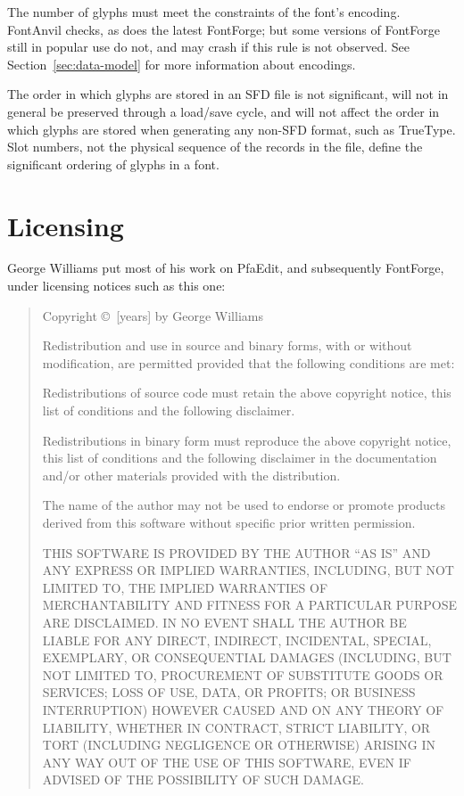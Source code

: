 \documentclass[11pt]{report}
\begin{document}
The number of glyphs must meet the constraints of the font's encoding. 
FontAnvil checks, as does the latest FontForge; but some versions of
FontForge still in popular use do not, and may crash if this rule is not
observed.  See Section~\ref{sec:data-model} for more information about
encodings.

The order in which glyphs are stored in an SFD file is not significant, will
not in general be preserved through a load/save cycle, and will not affect
the order in which glyphs are stored when generating any non-SFD format,
such as TrueType.  Slot numbers, not the physical sequence of the records in
the file, define the significant ordering of glyphs in a font.

\clearpage
\fi

\chapter{Licensing}

George Williams put most of his work on PfaEdit, and subsequently FontForge,
under licensing notices such as this one:

\begin{quotation}
Copyright \copyright\ [years] by George Williams

Redistribution and use in source and binary forms, with or without
modification, are permitted provided that the following conditions are met:

Redistributions of source code must retain the above copyright notice, this
list of conditions and the following disclaimer.

Redistributions in binary form must reproduce the above copyright notice,
this list of conditions and the following disclaimer in the documentation
and/or other materials provided with the distribution.

The name of the author may not be used to endorse or promote products
derived from this software without specific prior written permission.

THIS SOFTWARE IS PROVIDED BY THE AUTHOR ``AS IS'' AND ANY EXPRESS OR IMPLIED
WARRANTIES, INCLUDING, BUT NOT LIMITED TO, THE IMPLIED WARRANTIES OF
MERCHANTABILITY AND FITNESS FOR A PARTICULAR PURPOSE ARE DISCLAIMED.  IN NO
EVENT SHALL THE AUTHOR BE LIABLE FOR ANY DIRECT, INDIRECT, INCIDENTAL,
SPECIAL, EXEMPLARY, OR CONSEQUENTIAL DAMAGES (INCLUDING, BUT NOT LIMITED TO,
PROCUREMENT OF SUBSTITUTE GOODS OR SERVICES; LOSS OF USE, DATA, OR PROFITS;
OR BUSINESS INTERRUPTION) HOWEVER CAUSED AND ON ANY THEORY OF LIABILITY,
WHETHER IN CONTRACT, STRICT LIABILITY, OR TORT (INCLUDING NEGLIGENCE OR
OTHERWISE) ARISING IN ANY WAY OUT OF THE USE OF THIS SOFTWARE, EVEN IF
ADVISED OF THE POSSIBILITY OF SUCH DAMAGE.
\end{quotation}
\end{document}
